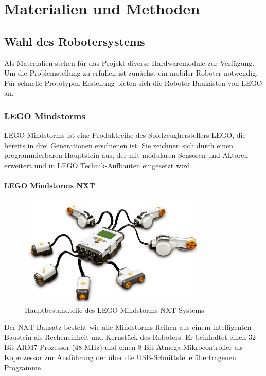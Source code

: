 \chapter{Materialien und Methoden}
\label{cha:Materials}

\section{Wahl des Robotersystems}

Als Materialien stehen für das Projekt diverse Hardwaremodule zur Verfügung. Um die Problemstellung zu erfüllen ist zunächst ein mobiler Roboter notwendig. Für schnelle Prototypen-Erstellung bieten sich die Roboter-Baukästen von LEGO an.

\subsection{LEGO Mindstorms}

LEGO Mindstorms ist eine Produktreihe des Spielzeugherstellers LEGO, die bereits in drei Generationen erschienen ist. Sie zeichnen sich durch einen programmierbaren Hauptstein aus, der mit modularen Sensoren und Aktoren erweitert und in LEGO Technik-Aufbauten eingesetzt wird.

\subsubsection{LEGO Mindstorms NXT}

\begin{figure}[h]
\centering
\includegraphics[width=0.8\textwidth]{Bilder/MatsAndMets/nxt}
\caption{Hauptbestandteile des LEGO Mindstorms NXT-Systems}
\label{fig:nxt}
\end{figure}

Der NXT-Bausatz besteht wie alle Mindstorms-Reihen aus einem intelligenten Baustein als Recheneinheit und Kernstück des Roboters. Er beinhaltet einen 32-Bit ARM7-Prozessor (48 MHz) und einen 8-Bit Atmega-Mikrocontroller als Koprozessor zur Ausführung der über die USB-Schnittstelle übertragenen Programme.

